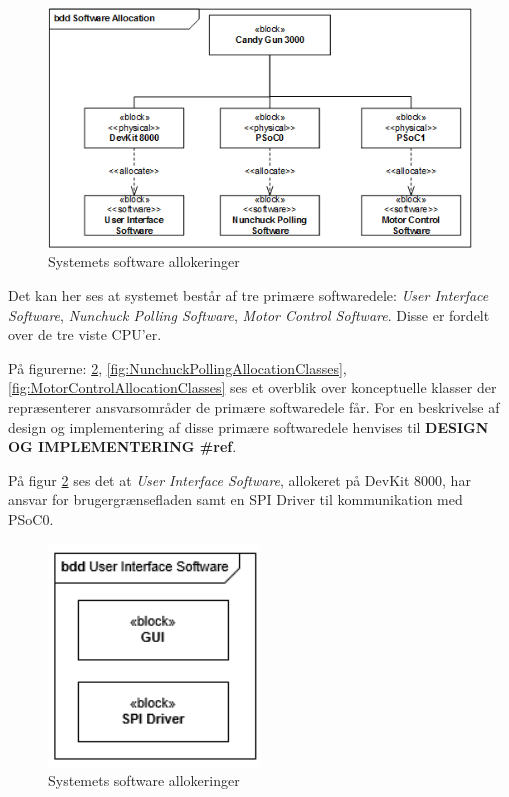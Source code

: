 \begin{figure}[H]
	\centering
	\includegraphics[width=\textwidth]{SystemArkitektur/images/SoftwareAllocation.PNG}
	\caption{Systemets software allokeringer}
	\label{figure:allocationDiagram}
\end{figure}

Det kan her ses at systemet består af tre primære softwaredele: \textit{User Interface Software}, \textit{Nunchuck Polling Software}, \textit{Motor Control Software}. Disse er fordelt over de tre viste CPU'er.

På figurerne: \ref{fig:UserInterfaceAllocationClasses}, \ref{fig:NunchuckPollingAllocationClasses}, \ref{fig:MotorControlAllocationClasses} ses et overblik over konceptuelle klasser der repræsenterer ansvarsområder de primære softwaredele får. For en beskrivelse af design og implementering af disse primære softwaredele henvises til \textbf{DESIGN OG IMPLEMENTERING \#ref}.

På figur \ref{fig:UserInterfaceAllocationClasses} ses det at \textit{User Interface Software}, allokeret på DevKit 8000, har ansvar for brugergrænsefladen samt en SPI Driver til kommunikation med PSoC0. 

\begin{figure}[H]
	\centering
	\includegraphics[width=0.5\textwidth]{SystemArkitektur/images/UserInterfaceAllocationClasses.PNG}
	\caption{Systemets software allokeringer}
	\label{fig:UserInterfaceAllocationClasses}
\end{figure}

